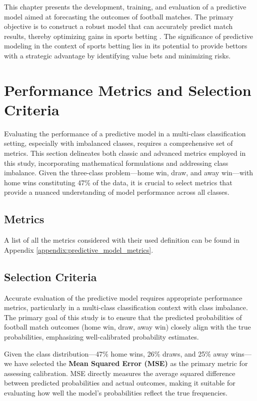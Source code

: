 This chapter presents the development, training, and evaluation of a predictive model aimed at forecasting the outcomes of football matches. The primary objective is to construct a robust model that can accurately predict match results, thereby optimizing gains in sports betting \cite{BaioBlangiardo2010} \cite{DixonColes1997}. The significance of predictive modeling in the context of sports betting lies in its potential to provide bettors with a strategic advantage by identifying value bets and minimizing risks.

\section{Performance Metrics and Selection Criteria}
\label{sec:performance_metrics}

Evaluating the performance of a predictive model in a multi-class classification setting, especially with imbalanced classes, requires a comprehensive set of metrics. This section delineates both classic and advanced metrics employed in this study, incorporating mathematical formulations and addressing class imbalance. Given the three-class problem—home win, draw, and away win—with home wins constituting 47\% of the data, it is crucial to select metrics that provide a nuanced understanding of model performance across all classes.

\subsection{Metrics}
\label{subsec:classic_metrics}

A list of all the metrics considered with their used definition can  be found in Appendix \ref{appendix:predictive_model_metrics}.

\subsection{Selection Criteria}
\label{subsec:selection_criteria}

Accurate evaluation of the predictive model requires appropriate performance metrics, particularly in a multi-class classification context with class imbalance. The primary goal of this study is to ensure that the predicted probabilities of football match outcomes (home win, draw, away win) closely align with the true probabilities, emphasizing well-calibrated probability estimates.

Given the class distribution—47\% home wins, 26\% draws, and 25\% away wins—we have selected the \textbf{Mean Squared Error (MSE)} as the primary metric for assessing calibration. MSE directly measures the average squared difference between predicted probabilities and actual outcomes, making it suitable for evaluating how well the model's probabilities reflect the true frequencies.

